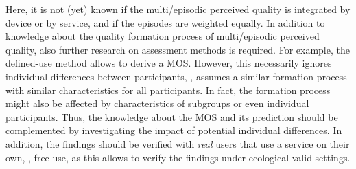 Here, it is not (yet) known if the multi\-/episodic perceived quality is integrated by device or by service, and if the episodes are weighted equally.
In addition to knowledge about the quality formation process of multi\-/episodic perceived quality, also further research on assessment methods is required.
For example, the defined-use method allows to derive a \ac{MOS}.
However, this necessarily ignores individual differences between participants, \ie, assumes a similar formation process with similar characteristics for all participants.
In fact, the formation process might also be affected by characteristics of subgroups or even individual participants.
Thus, the knowledge about the \ac{MOS} and its prediction should be complemented by investigating the impact of potential individual differences.
In addition, the findings should be verified with \emph{real} users that use a service on their own, \ie, free use, as this allows to verify the findings under ecological valid settings.